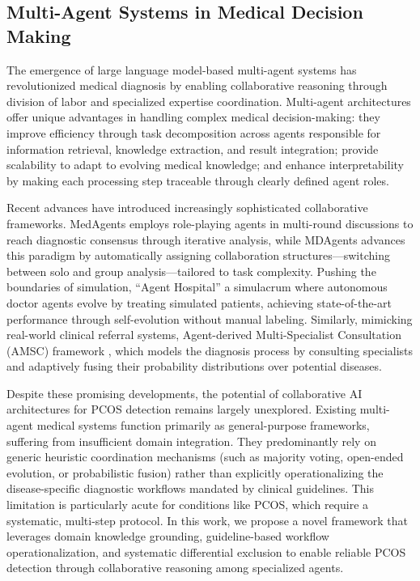 \documentclass[a4paper,fleqn]{cas-dc}
\begin{document}
\subsection{Multi-Agent Systems in Medical Decision Making}
The emergence of large language model-based multi-agent systems has revolutionized medical diagnosis by enabling collaborative reasoning through division of labor and specialized expertise coordination. Multi-agent architectures offer unique advantages in handling complex medical decision-making: they improve efficiency through task decomposition across agents responsible for information retrieval, knowledge extraction, and result integration; provide scalability to adapt to evolving medical knowledge; and enhance interpretability by making each processing step traceable through clearly defined agent roles.

Recent advances have introduced increasingly sophisticated collaborative frameworks. MedAgents \cite{tang-etal-2024-medagents} employs role-playing agents in multi-round discussions to reach diagnostic consensus through iterative analysis, while MDAgents \cite{kim2024mdagents} 
advances this paradigm by automatically assigning collaboration structures—switching between solo and group analysis—tailored to task complexity. Pushing the boundaries of simulation, ``Agent Hospital'' \cite{li2024agent} a simulacrum where autonomous doctor agents evolve by treating simulated patients, achieving state-of-the-art performance through self-evolution without manual labeling. Similarly, mimicking real-world clinical referral systems, Agent-derived Multi-Specialist Consultation (AMSC) framework \cite{wang2024beyond}, which models the diagnosis process by consulting specialists and adaptively fusing their probability distributions over potential diseases.

Despite these promising developments, the potential of collaborative AI architectures for PCOS detection remains largely unexplored. Existing multi-agent medical systems function primarily as general-purpose frameworks, suffering from insufficient domain integration. They predominantly rely on generic heuristic coordination mechanisms (such as majority voting, open-ended evolution, or probabilistic fusion) rather than explicitly operationalizing the disease-specific diagnostic workflows mandated by clinical guidelines. This limitation is particularly acute for conditions like PCOS, which require a systematic, multi-step protocol. In this work, we propose a novel framework that leverages domain knowledge grounding, guideline-based workflow operationalization, and systematic differential exclusion to enable reliable PCOS detection through collaborative reasoning among specialized agents.
\end{document}
